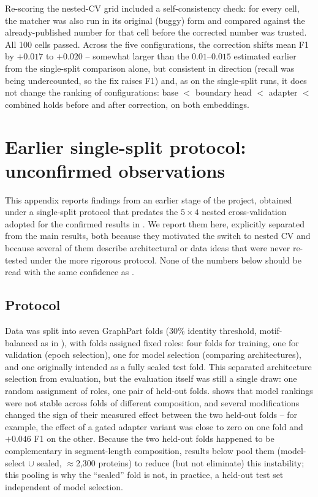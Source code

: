 \documentclass{article}
\begin{document}
Re-scoring the nested-CV grid included a self-consistency check: for every cell, the matcher was also run in its original (buggy) form and compared against the already-published number for that cell before the corrected number was trusted. All 100 cells passed. Across the five configurations, the correction shifts mean F1 by $+0.017$ to $+0.020$ -- somewhat larger than the $0.01$--$0.015$ estimated earlier from the single-split comparison alone, but consistent in direction (recall was being undercounted, so the fix raises F1) and, as on the single-split runs, it does not change the ranking of configurations: base $<$ boundary head $<$ adapter $<$ combined holds before and after correction, on both embeddings.


\section{Earlier single-split protocol: unconfirmed observations}
\label{sec:app-old-protocol}

This appendix reports findings from an earlier stage of the project, obtained under a single-split protocol that predates the $5\times4$ nested cross-validation adopted for the confirmed results in . We report them here, explicitly separated from the main results, both because they motivated the switch to nested CV and because several of them describe architectural or data ideas that were never re-tested under the more rigorous protocol. None of the numbers below should be read with the same confidence as .

\subsection{Protocol}

Data was split into seven GraphPart folds (30\% identity threshold, motif-balanced as in ), with folds assigned fixed roles: four folds for training, one for validation (epoch selection), one for model selection (comparing architectures), and one originally intended as a fully sealed test fold. This separated architecture selection from evaluation, but the evaluation itself was still a single draw: one random assignment of roles, one pair of held-out folds.  shows that model rankings were not stable across folds of different composition, and several modifications changed the sign of their measured effect between the two held-out folds -- for example, the effect of a gated adapter variant was close to zero on one fold and $+0.046$ F1 on the other. Because the two held-out folds happened to be complementary in segment-length composition, results below pool them (model-select $\cup$ sealed, $\approx$2{,}300 proteins) to reduce (but not eliminate) this instability; this pooling is why the ``sealed'' fold is not, in practice, a held-out test set independent of model selection.
\end{document}
